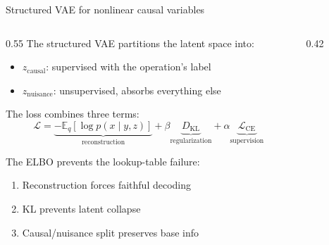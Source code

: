 \documentclass[aspectratio=169,11pt]{beamer}
\begin{document}
\begin{frame}{Structured VAE for nonlinear causal variables}

\begin{columns}[T]
\begin{column}{0.55\textwidth}
{\small The structured VAE partitions the latent space into:}
\begin{itemize}
  \item {\small $z_\text{causal}$: supervised with the operation's label}
  \item {\small $z_\text{nuisance}$: unsupervised, absorbs everything else}
\end{itemize}

\vspace{0.3em}
{\small The loss combines three terms:}
$$\mathcal{L} = \underbrace{-\mathbb{E}_q[\log p(x \mid y, z)]}_{\text{reconstruction}} + \beta \underbrace{D_\text{KL}}_{\text{regularization}} + \alpha \underbrace{\mathcal{L}_\text{CE}}_{\text{supervision}}$$

\vspace{0.3em}
{\small The ELBO prevents the lookup-table failure:}
\begin{enumerate}
  \item {\small Reconstruction forces faithful decoding}
  \item {\small KL prevents latent collapse}
  \item {\small Causal/nuisance split preserves base info}
\end{enumerate}
\end{column}
\begin{column}{0.42\textwidth}
\end{column}
\end{columns}
\end{frame}
\end{document}
